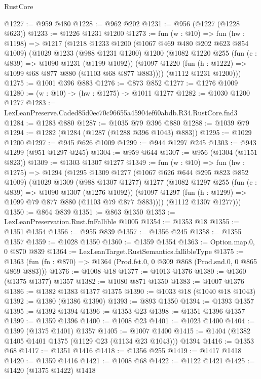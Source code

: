 \begin{lexlean}{RustCore}
\begin{coremodule}
@1227 := @959 @480
@1228 := @962 @202
@1231 := @956 (@1227 (@1228 @623))
@1233 := @1226 @1231 @1200
@1273 := fun (w : @10) =>
  fun (hw : @1198) =>
  @1217
    (@1218
      @1233
      @1200
      (@1067 @469 @480 @202 @623 @854 @1009)
      (@1029
        @1233
        (@988 @1231 @1200)
        @1200
        (@1082
          @1220
          @255
          (fun (c : @839) => @1090 @1231 (@1199 @1092))
          (@1097 @1220 (fun (h : @1222) => @1099 @68 @877 @880 (@1103 @68 @877 @883))))
        (@1112 @1231 @1200)))
@1275 := @1001 @396 @883
@1276 := @873 @852
@1277 := @1276 @1009
@1280 := (w : @10) -> (hw : @1275) -> @1011 @1277
@1282 := @1030 @1200 @1277
@1283 := LexLeanPreserve.Caded85d0ec70c96655a45904ef60abdb.R34.RustCore.fnd3
@1284 := @1283 @880
@1287 := @1035 @79 @396 @880
@1288 := @1039 @79
@1294 := @1282 (@1284 (@1287 (@1288 @396 @1043) @883))
@1295 := @1029 @1200
@1297 := @945 @626 @1009
@1299 := @944 @1297 @245
@1303 := @943 @1299 (@951 @1297 @245)
@1304 := @959 @644
@1307 := @956 (@1304 (@1151 @823))
@1309 := @1303 @1307 @1277
@1349 := fun (w : @10) =>
  fun (hw : @1275) =>
  @1294
    (@1295
      @1309
      @1277
      (@1067 @626 @644 @295 @823 @852 @1009)
      (@1029
        @1309
        (@988 @1307 @1277)
        @1277
        (@1082
          @1297
          @255
          (fun (c : @839) => @1090 @1307 (@1276 @1092))
          (@1097 @1297 (fun (h : @1299) => @1099 @79 @877 @880 (@1103 @79 @877 @883))))
        (@1112 @1307 @1277)))
@1350 := @864 @839
@1351 := @863 @1350
@1353 := LexLeanPreservation.Rust.fnFallible @1005
@1354 := @1353 @18
@1355 := @1351 @1354
@1356 := @955 @839
@1357 := @1356 @245
@1358 := @1355 @1357
@1359 := @1028 @1350
@1360 := @1359 @1354
@1363 := Option.map.{0, 0} @870 @839
@1364 := LexLeanTarget.RustSemantics.fallibleType
@1375 := @1363
    (fun (fn : @870) => @1364 (Prod.fst.{0, 0} @309 @868 (Prod.snd.{0, 0} @865 @869 @883)))
@1376 := @1008 @18
@1377 := @1013 @1376
@1380 := @1360 (@1375 @1377) @1357
@1382 := @1080 @871 @1350
@1383 := @1007 @1376
@1386 := @1382 @1383 @1377 @1375
@1390 := @1033 @18 (@1040 @18 @1043)
@1392 := @1380 (@1386 @1390)
@1393 := @893 @1350
@1394 := @1393 @1357
@1395 := @1392 @1394
@1396 := @1353 @23
@1398 := @1351 @1396 @1357
@1399 := @1359 @1396
@1400 := @1008 @23
@1401 := @1023 @1400
@1404 := @1399 (@1375 @1401) @1357
@1405 := @1007 @1400
@1415 := @1404 (@1382 @1405 @1401 @1375 (@1129 @23 (@1134 @23 @1043))) @1394
@1416 := @1353 @68
@1417 := @1351 @1416
@1418 := @1356 @255
@1419 := @1417 @1418
@1420 := @1359 @1416
@1421 := @1008 @68
@1422 := @1122 @1421
@1425 := @1420 (@1375 @1422) @1418

\end{coremodule}
\end{lexlean}
